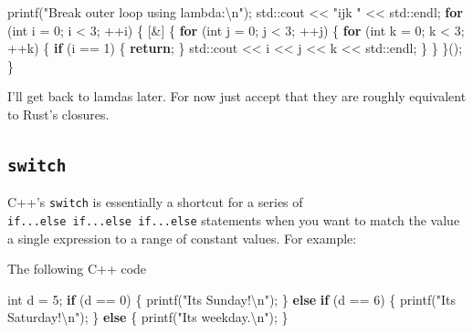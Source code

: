 \documentclass[
]{book}
\newenvironment{Shaded}{\begin{snugshade}}{\end{snugshade}}
\newcommand{\BuiltInTok}[1]{#1}
\newcommand{\ControlFlowTok}[1]{\textcolor[rgb]{0.13,0.29,0.53}{\textbf{#1}}}
\newcommand{\DataTypeTok}[1]{\textcolor[rgb]{0.13,0.29,0.53}{#1}}
\newcommand{\DecValTok}[1]{\textcolor[rgb]{0.00,0.00,0.81}{#1}}
\newcommand{\NormalTok}[1]{#1}
\newcommand{\SpecialCharTok}[1]{\textcolor[rgb]{0.00,0.00,0.00}{#1}}
\newcommand{\StringTok}[1]{\textcolor[rgb]{0.31,0.60,0.02}{#1}}
\begin{document}
\begin{Shaded}
\begin{Highlighting}[]
\NormalTok{printf(}\StringTok{"Break outer loop using lambda:}\SpecialCharTok{\textbackslash{}n}\StringTok{"}\NormalTok{);}
\BuiltInTok{std::}\NormalTok{cout \textless{}\textless{} }\StringTok{"ijk "}\NormalTok{ \textless{}\textless{} }\BuiltInTok{std::}\NormalTok{endl;}
\ControlFlowTok{for}\NormalTok{ (}\DataTypeTok{int}\NormalTok{ i = }\DecValTok{0}\NormalTok{; i \textless{} }\DecValTok{3}\NormalTok{; ++i)}
\NormalTok{\{}
\NormalTok{    [\&] \{}
        \ControlFlowTok{for}\NormalTok{ (}\DataTypeTok{int}\NormalTok{ j = }\DecValTok{0}\NormalTok{; j \textless{} }\DecValTok{3}\NormalTok{; ++j)}
\NormalTok{        \{}
            \ControlFlowTok{for}\NormalTok{ (}\DataTypeTok{int}\NormalTok{ k = }\DecValTok{0}\NormalTok{; k \textless{} }\DecValTok{3}\NormalTok{; ++k)}
\NormalTok{            \{}
                \ControlFlowTok{if}\NormalTok{ (i == }\DecValTok{1}\NormalTok{)}
\NormalTok{                \{}
                    \ControlFlowTok{return}\NormalTok{;}
\NormalTok{                \}}
                \BuiltInTok{std::}\NormalTok{cout \textless{}\textless{} i \textless{}\textless{} j \textless{}\textless{} k \textless{}\textless{} }\BuiltInTok{std::}\NormalTok{endl;}
\NormalTok{            \}}
\NormalTok{        \}}
\NormalTok{    \}();}
\NormalTok{\}}
\end{Highlighting}
\end{Shaded}

I'll get back to lamdas later. For now just accept that they are roughly equivalent to Rust's closures.

\hypertarget{switch}{%
\subsection{\texorpdfstring{\texttt{switch}}{switch}}\label{switch}}

C++'s \texttt{switch} is essentially a shortcut for a series of \texttt{if...else\ if...else\ if...else} statements when you want to match the value a single expression to a range of constant values. For example:

The following C++ code

\begin{Shaded}
\begin{Highlighting}[]
\DataTypeTok{int}\NormalTok{ d = }\DecValTok{5}\NormalTok{;}
\ControlFlowTok{if}\NormalTok{ (d == }\DecValTok{0}\NormalTok{) \{}
\NormalTok{    printf(}\StringTok{"It\textquotesingle{}s Sunday!}\SpecialCharTok{\textbackslash{}n}\StringTok{"}\NormalTok{);}
\NormalTok{\} }\ControlFlowTok{else} \ControlFlowTok{if}\NormalTok{ (d == }\DecValTok{6}\NormalTok{) \{}
\NormalTok{    printf(}\StringTok{"It\textquotesingle{}s Saturday!}\SpecialCharTok{\textbackslash{}n}\StringTok{"}\NormalTok{);}
\NormalTok{\} }\ControlFlowTok{else}\NormalTok{ \{}
\NormalTok{    printf(}\StringTok{"It\textquotesingle{}s weekday.}\SpecialCharTok{\textbackslash{}n}\StringTok{"}\NormalTok{);}
\NormalTok{\}}
\end{Highlighting}
\end{Shaded}
\end{document}
